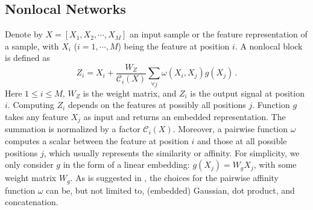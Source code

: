 \documentclass{article}
\newcommand{\xb}{\bm{x}}
\newcommand{\wb}{\bm{w}}
\begin{document}
\subsection{Nonlocal Networks}
Denote by $X=[X_1, X_2, \cdots, X_M]$ an input sample or the feature representation of a sample, with $X_i$ ($i=1,\cdots,M$) being the feature at position $i$. A nonlocal block \cite{wang2017non} is defined as
\begin{equation}\label{nl-bl-old}
Z_i = X_i + \frac{W_{Z}}{\mathcal{C}_i(X)} \sum_{\forall j} \omega(X_i,X_j)g(X_j)\,.
\end{equation}
Here $1\le i\le M$, $W_Z$ is the weight matrix, and $Z_i$ is the output signal at position $i$. Computing $Z_i$ depends on the features at possibly all positions $j$. Function $g$ takes any feature $X_j$ as input and returns an embedded representation. The summation is normalized by a factor $\mathcal{C}_i(X)$. Moreover, a pairwise function $\omega$ computes a scalar between the feature at position $i$ and those at all possible positions $j$, which usually represents the similarity or affinity. For simplicity, we only consider $g$ in the form of a linear embedding: $g(X_j)=W_g X_j$, with some weight matrix $W_g$. As is suggested in \cite{wang2017non}, the choices for the pairwise affinity function $\omega$ can be, but not limited to, (embedded) Gaussian, dot product, and concatenation.
\end{document}
